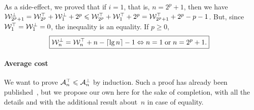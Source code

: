 As a side-effect, we proved that if \(i=1\), that is, \(n=2^p +
1\), then we have \(\mathcal{W}_{2^p+1}^{\bot} = \mathcal{W}_{2^p}^{\top} +
\mathcal{W}_{1}^{\bot} + 2^p \leqslant \mathcal{W}_{2^p}^{\top} +
\mathcal{W}_{1}^{\top} + 2^p = \mathcal{W}_{2^p+1}^{\top} + 2^p - p - 1\). But,
since \(\mathcal{W}_{1}^{\top} = \mathcal{W}_{1}^{\bot} = 0\), the inequality is
an equality. If \(p \geqslant 0\),
\begin{equation*}
\boxed{\mathcal{W}_{n}^{\bot} = \mathcal{W}_{n}^{\top} + n - \lceil{\lg n}\rceil - 1
  \Leftrightarrow n=1 \;\text{or}\; n=2^p+1.}
\end{equation*}


\paragraph{Average cost}

We want to prove \(\mathcal{A}_{n}^{\top} \leqslant \mathcal{A}_{n}^{\bot}\) by
induction. Such a proof has already been
published~\cite{ChenHwangChen:1999}, but we propose our own here for
the sake of completion, with all the details and with the additional
result about~\(n\) in case of equality.

